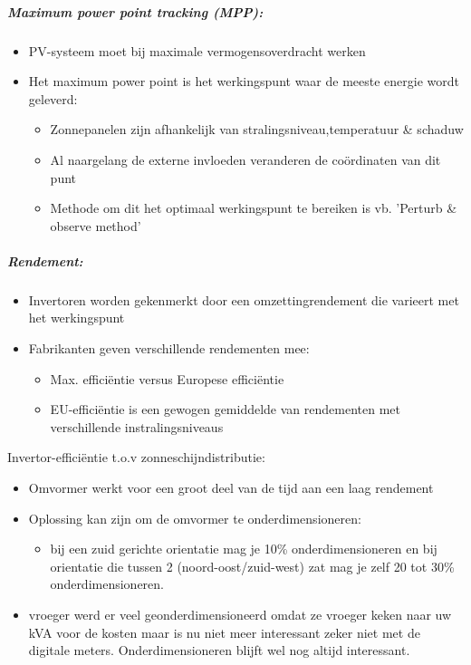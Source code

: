 \documentclass[12pt]{article}
\begin{document}
\subparagraph{Maximum power point tracking (MPP):}
\begin{itemize}
    \item[] PV-systeem moet bij maximale vermogensoverdracht werken 
    \item[] Het maximum power point is het werkingspunt waar de meeste energie wordt geleverd:\begin{itemize}
        \item Zonnepanelen zijn afhankelijk van stralingsniveau,temperatuur \& schaduw 
        \item Al naargelang de externe invloeden veranderen de coördinaten van dit punt
        \item Methode om dit het optimaal werkingspunt te bereiken is vb. 'Perturb \& observe method'
    \end{itemize}
\end{itemize}
\subparagraph{Rendement:}
\begin{itemize}
    \item Invertoren worden gekenmerkt door een omzettingrendement die varieert met
    het werkingspunt
    \item Fabrikanten geven verschillende rendementen mee:\begin{itemize}
        \item Max. efficiëntie versus Europese efficiëntie
        \item EU-efficiëntie is een gewogen gemiddelde van rendementen met verschillende instralingsniveaus
    \end{itemize}
\end{itemize}
Invertor-efficiëntie t.o.v zonneschijndistributie:\begin{itemize}
    \item Omvormer werkt voor een groot deel van de tijd aan een laag rendement 
    \item Oplossing kan zijn om de omvormer te onderdimensioneren:\begin{itemize}
        \item bij een zuid gerichte orientatie mag je 10\% onderdimensioneren en bij orientatie die tussen 2 (noord-oost/zuid-west) zat mag je zelf 20 tot 30\% onderdimensioneren.
    \end{itemize}
    \item vroeger werd er veel geonderdimensioneerd omdat ze vroeger keken naar uw kVA voor de kosten maar is nu niet meer interessant zeker niet met de digitale meters. Onderdimensioneren blijft wel nog altijd interessant.
\end{itemize}
\end{document}
